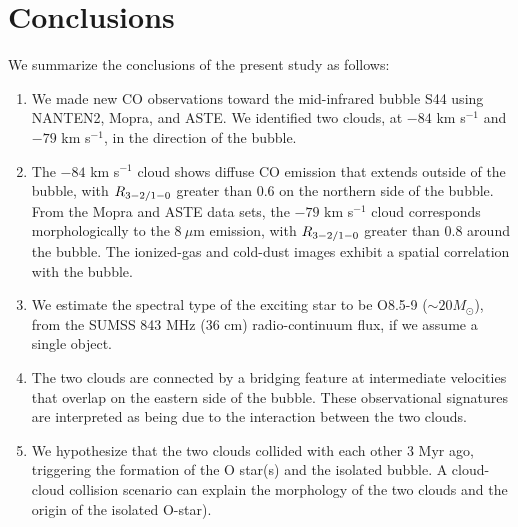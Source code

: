 \documentclass[onecolumn]{pasj01}
\begin{document}
{{{{{{\section{Conclusions}
We summarize the conclusions of the present study as follows:
\begin{enumerate}
\item We made new CO observations toward the mid-infrared bubble S44 using NANTEN2, Mopra, and ASTE. {We identified} two clouds, {at} $-84$ km s$^{-1}$ and $-79$ km s$^{-1}$, {in the direction of} the bubble.
\item The $-84$ km s$^{-1}$ {cloud} shows diffuse CO emission {that} extend{s} outside of the bubble, {with} $R_{\rm 3-2/1-0}$ {greater} than 0.6 {on the} northern side of the bubble.
{From the Mopra and ASTE data sets,} the $-79$ km s$^{-1}$ cloud correspond{s morphologically to} the $8\ \mu$m emission, {with} $R_{\rm 3-2/1-0}$ {greater} than 0.8 around the bubble. The ionized-gas and cold-dust images {exhibit} a spatial correlation {with} the bubble. 
\item We estimate the spectral type of the exciting star {to be} {O8.5-9} ($\sim 20 M_{\odot}$), from the SUMSS 843 MHz (36 cm) radio-continuum flux, if we assume a single object. 
\item The two clouds are {connected} {by a} bridging feature at intermediate {velocities that} overlap on the eastern side of the bubble. These observational signatures are interpreted {as being due to the} {interaction} {between the two clouds}.
\item We {hypothesize} that the two clouds {collided with} each other {3 Myr ago,} triggering {the formation of {the O star(s)} and the} isolated bubble.
A cloud-cloud collision scenario can explain the morphology of the two clouds {and the origin of the isolated O-star).}
\end{enumerate}

}}}}}}
\end{document}
